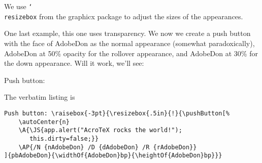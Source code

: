 \documentclass{article}
\newcommand{\cs}[1]{\texttt{\char`\\#1}}
\begin{document}
We use \cs{resizebox} from the \textsf{graphicx} package to adjust
the sizes of the appearances.

\newpage


One last example, this one uses transparency. We now we create a push
button with the face of AdobeDon as the normal appearance (somewhat
paradoxically), AdobeDon at 50\% opacity for the rollover
appearance, and AdobeDon at 30\% for the down appearance. Will it
work, we'll see:\medskip

Push button: 

\medskip The verbatim listing is
\begin{small}
\begin{verbatim}
Push button: \raisebox{-3pt}{\resizebox{.5in}{!}{\pushButton[%
    \autoCenter{n}
    \A{\JS{app.alert("AcroTeX rocks the world!");
       this.dirty=false;}}
    \AP{/N {nAdobeDon} /D {dAdobeDon} /R {rAdobeDon}}
]{pbAdobeDon}{\widthOf{AdobeDon}bp}{\heightOf{AdobeDon}bp}}}
\end{verbatim}
\end{small}
\end{document}
